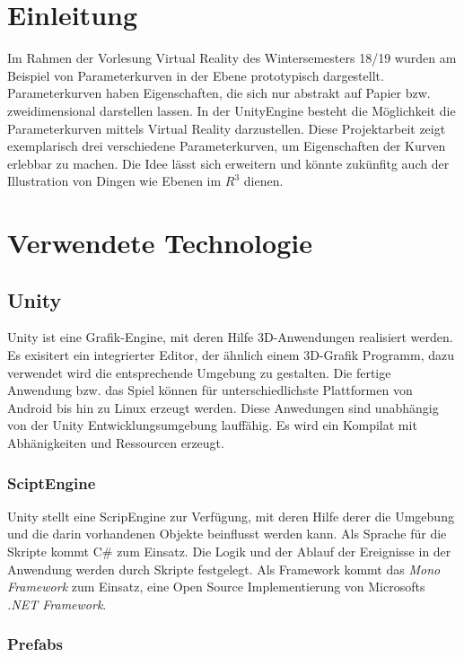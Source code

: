 
\chapter{Einleitung}
\label{Einleitung}

Im Rahmen der Vorlesung Virtual Reality des Wintersemesters 18/19 wurden am Beispiel von Parameterkurven in der Ebene prototypisch dargestellt.
Parameterkurven haben Eigenschaften, die sich nur abstrakt auf Papier bzw. zweidimensional darstellen lassen.
In der UnityEngine besteht die Möglichkeit die Parameterkurven mittels Virtual Reality darzustellen.  
Diese Projektarbeit zeigt exemplarisch drei verschiedene Parameterkurven, um Eigenschaften der Kurven erlebbar zu machen. 
Die Idee lässt sich erweitern und könnte zukünfitg auch der Illustration von Dingen wie Ebenen im $R^{3}$ dienen.

\chapter{Verwendete Technologie}
\label{Technologie}
\section{Unity}
Unity ist eine Grafik-Engine, mit deren Hilfe 3D-Anwendungen realisiert werden. Es exisitert ein integrierter Editor, der ähnlich einem 3D-Grafik Programm, dazu verwendet wird die entsprechende Umgebung zu gestalten. Die fertige Anwendung bzw. das Spiel können für unterschiedlichste Plattformen von Android bis hin zu Linux erzeugt werden. Diese Anwedungen sind unabhängig von der Unity Entwicklungsumgebung lauffähig. Es wird ein Kompilat mit Abhänigkeiten und Ressourcen erzeugt.

\subsection{SciptEngine}
Unity stellt eine ScripEngine zur Verfügung, mit deren Hilfe derer die Umgebung und die darin vorhandenen Objekte beinflusst werden kann. Als Sprache für die Skripte kommt C\# zum Einsatz. Die Logik und der Ablauf der Ereignisse in der Anwendung werden durch Skripte festgelegt. Als Framework kommt das \emph{Mono Framework} zum Einsatz, eine Open Source Implementierung von Microsofts \emph{.NET Framework}.

\subsection{Prefabs}

